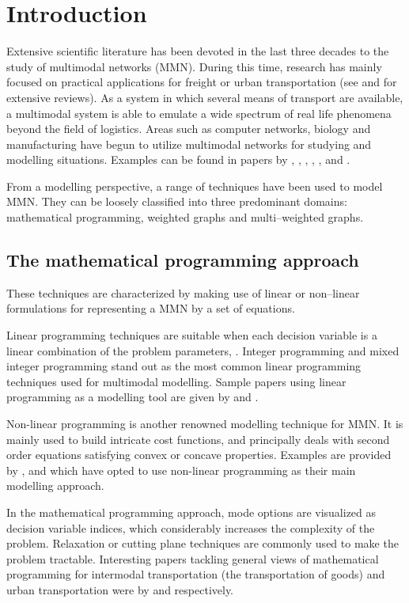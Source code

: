 \documentclass[preprint,authoryear,12pt]{elsarticle}
\begin{document}
\section{Introduction}\label{Se:Introduction}
Extensive scientific literature has been devoted in the last three
decades to the study of multimodal networks (MMN).
During this time, research has mainly focused on practical
applications for freight or urban transportation
(see \cite{D937} and \cite{D949} for extensive reviews).
As a system in which several means of transport are available,
a multimodal system is able to emulate a wide spectrum of real life
phenomena beyond the field of logistics.
Areas such as computer networks, biology and
manufacturing have begun to utilize multimodal networks for
studying and modelling situations. Examples can be found in
papers by \cite{D92}, \cite{D920}, \cite{D933}, \cite{D941},
\cite{D957}, \cite{D950} and \cite{D964}.

From a modelling perspective, a range of techniques have been
used to model MMN. They can be loosely classified into three
predominant domains: mathematical programming, weighted graphs and
multi--weighted graphs.

\subsection{The mathematical programming approach}\label{SubSe:MathematicalProgrammingApproach}

These techniques are characterized by making use of linear or
non--linear formulations for representing a MMN by a set of
equations.

Linear programming techniques are suitable when each decision
variable is a linear combination of the problem parameters,
\cite{D935}. Integer programming and mixed integer programming
stand out as the most common linear programming techniques used
for multimodal modelling. Sample papers using linear programming
as a modelling tool are given by \cite{D952} and \cite{Kim1999}.

Non-linear programming is another renowned modelling technique for
MMN. It is mainly used to build intricate cost functions, and
principally deals with second order equations satisfying convex or
concave properties. Examples are provided by \cite{D942}, \cite{D936} and
\cite{D916} which have opted to use non-linear programming as
their main modelling approach.

In the  mathematical programming approach, mode options are
visualized as decision variable indices, which considerably
increases the complexity of the problem. Relaxation  or cutting
plane techniques are commonly used to make the problem tractable.
Interesting papers tackling general views of mathematical
programming for intermodal transportation (the transportation of
goods) and urban transportation were by \cite{D937} and \cite{D955}
respectively.
\end{document}
